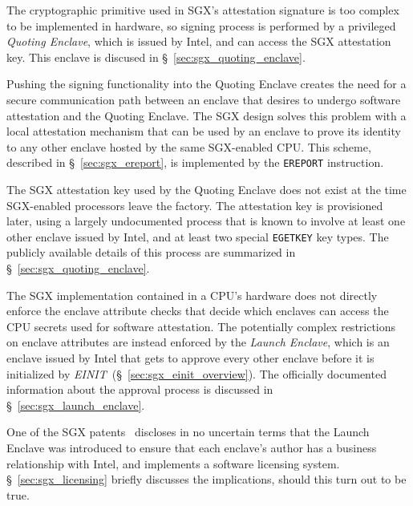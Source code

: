 The cryptographic primitive used in SGX's attestation signature is too complex
to be implemented in hardware, so signing process is performed by a privileged
\textit{Quoting Enclave}, which is issued by Intel, and can access the SGX
attestation key. This enclave is discused in \S~\ref{sec:sgx_quoting_enclave}.

Pushing the signing functionality into the Quoting Enclave creates the need for
a secure communication path between an enclave that desires to undergo
software attestation and the Quoting Enclave. The SGX design solves this
problem with a local attestation mechanism that can be used by an enclave to
prove its identity to any other enclave hosted by the same SGX-enabled CPU.
This scheme, described in \S~\ref{sec:sgx_ereport}, is implemented by the
\texttt{EREPORT} instruction.


The SGX attestation key used by the Quoting Enclave does not exist at the time
SGX-enabled processors leave the factory. The attestation key is provisioned
later, using a largely undocumented process that is known to involve at least
one other enclave issued by Intel, and at least two special \texttt{EGETKEY}
key types. The publicly available details of this process are summarized in
\S~\ref{sec:sgx_quoting_enclave}.

The SGX implementation contained in a CPU's hardware does not directly enforce
the enclave attribute checks that decide which enclaves can access the CPU
secrets used for software attestation. The potentially complex restrictions on
enclave attributes are instead enforced by the \textit{Launch Enclave}, which
is an enclave issued by Intel that gets to approve every other enclave before
it is initialized by \textit{EINIT}~(\S~\ref{sec:sgx_einit_overview}). The
officially documented information about the approval process is discussed in
\S~\ref{sec:sgx_launch_enclave}.


One of the SGX patents~\cite{intel2013patent1} discloses in no uncertain terms
that the Launch Enclave was introduced to ensure that each enclave's author has
a business relationship with Intel, and implements a software licensing system.
\S~\ref{sec:sgx_licensing} briefly discusses the implications, should this turn
out to be true.


